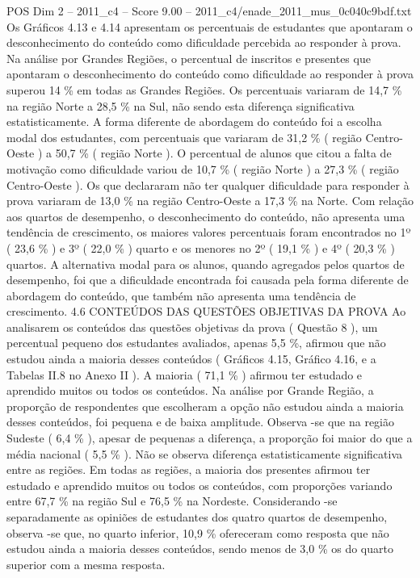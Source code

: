 \begin{textsample}{POS Dim 2 – 2011\_c4 – Score 9.00 – 2011\_c4/enade\_2011\_mus\_0c040c9bdf.txt}
Os Gráficos 4.13 e 4.14 apresentam os percentuais de estudantes que apontaram o desconhecimento do conteúdo como dificuldade percebida ao responder à prova.
Na análise por Grandes Regiões, o percentual de inscritos e presentes que apontaram o desconhecimento do conteúdo como dificuldade ao responder à prova superou 14 \% em todas as Grandes Regiões.
Os percentuais variaram de 14,7 \% na região Norte a 28,5 \% na Sul, não sendo esta diferença significativa estatisticamente.
A forma diferente de abordagem do conteúdo foi a escolha modal dos estudantes, com percentuais que variaram de 31,2 \% ( região Centro-Oeste ) a 50,7 \% ( região Norte ).
O percentual de alunos que citou a falta de motivação como dificuldade variou de 10,7 \% ( região Norte ) a 27,3 \% ( região Centro-Oeste ).
Os que declararam não ter qualquer dificuldade para responder à prova variaram de 13,0 \% na região Centro-Oeste a 17,3 \% na Norte.
Com relação aos quartos de desempenho, o desconhecimento do conteúdo, não apresenta uma tendência de crescimento, os maiores valores percentuais foram encontrados no 1º ( 23,6 \% ) e 3º ( 22,0 \% ) quarto e os menores no 2º ( 19,1 \% ) e 4º ( 20,3 \% ) quartos.
A alternativa modal para os alunos, quando agregados pelos quartos de desempenho, foi que a dificuldade encontrada foi causada pela forma diferente de abordagem do conteúdo, que também não apresenta uma tendência de crescimento. 4.6 CONTEÚDOS DAS QUESTÕES OBJETIVAS DA PROVA Ao analisarem os conteúdos das questões objetivas da prova ( Questão 8 ), um percentual pequeno dos estudantes avaliados, apenas 5,5 \%, afirmou que não estudou ainda a maioria desses conteúdos ( Gráficos 4.15, Gráfico 4.16, e a Tabelas II.8 no Anexo II ).
A maioria ( 71,1 \% ) afirmou ter estudado e aprendido muitos ou todos os conteúdos.
Na análise por Grande Região, a proporção de respondentes que escolheram a opção não estudou ainda a maioria desses conteúdos, foi pequena e de baixa amplitude.
Observa -se que na região Sudeste ( 6,4 \% ), apesar de pequenas a diferença, a proporção foi maior do que a média nacional ( 5,5 \% ).
Não se observa diferença estatisticamente significativa entre as regiões.
Em todas as regiões, a maioria dos presentes afirmou ter estudado e aprendido muitos ou todos os conteúdos, com proporções variando entre 67,7 \% na região Sul e 76,5 \% na Nordeste.
Considerando -se separadamente as opiniões de estudantes dos quatro quartos de desempenho, observa -se que, no quarto inferior, 10,9 \% ofereceram como resposta que não estudou ainda a maioria desses conteúdos, sendo menos de 3,0 \% os do quarto superior com a mesma resposta.

\end{textsample}

